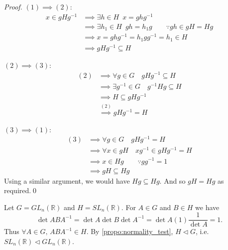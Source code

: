 \begin{proof}
  $( 1 ) \implies ( 2 )$:
  \begin{align*}
    x \in gHg^{-1} &\implies \exists h \in H \enspace x = ghg^{-1} \\
      &\implies \exists h_1 \in H \enspace gh = h_1 g \qquad \because gh \in gH = Hg \\
      &\implies x = ghg^{-1} = h_1 gg^{-1} = h_1 \in H \\
      &\implies gHg^{-1} \subseteq H
  \end{align*}

  \noindent$( 2 ) \implies ( 3 )$:
  \begin{align*}
    ( 2 ) &\implies \forall g \in G \quad gHg^{-1} \subseteq H \\
      &\implies \exists g^{-1} \in G \quad g^{-1}Hg \subseteq H \\
      &\implies H \subseteq gHg^{-1} \\
      &\overset{(2)}{\implies} gHg^{-1} = H
  \end{align*}

  \noindent$( 3 ) \implies ( 1 )$:
  \begin{align*}
    ( 3 ) &\implies \forall g \in G \quad gHg^{-1} = H \\
      &\implies \forall x \in gH \quad xg^{-1} \in gHg^{-1} = H \\
      &\implies x \in Hg \qquad \because gg^{-1} = 1 \\
      &\implies gH \subseteq Hg
  \end{align*}
  Using a similar argument, we would have $Hg \subseteq Hg$. And so $gH = Hg$ as required.\qed
\end{proof}

\begin{eg}
  Let $G = GL_n(\mathbb{R})$ and $H = SL_n(\mathbb{R})$. For $A \in G$ and $B \in H$ we have
  \begin{equation*}
    \det ABA^{-1} = \det A \det B \det A^{-1} = \det A (1) \frac{1}{\det A} = 1.
  \end{equation*}
  Thus $\forall A \in G, \, ABA^{-1} \in H$. By \cref{propo:normality_test}, $H \triangleleft G$, i.e. $SL_n(\mathbb{R}) \triangleleft GL_n(\mathbb{R})$.
\end{eg}

